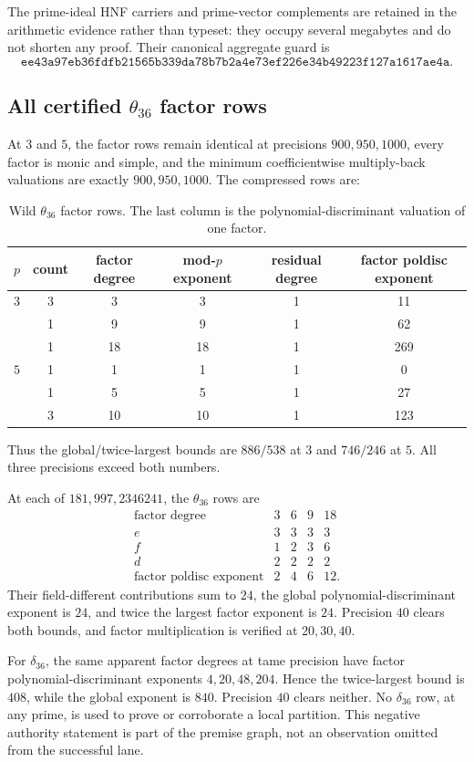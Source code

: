 The prime-ideal HNF carriers and prime-vector complements are retained in the
arithmetic evidence rather than typeset: they occupy several megabytes and
do not shorten any proof.  Their canonical aggregate guard is
\[
\texttt{ee43a97eb36fdfb21565b339da78b7b2a4e73ef226e34b49223f127a1617ae4a}.
\]

\subsection{\texorpdfstring{All certified \(\theta_{36}\) factor rows}{All certified theta36 factor rows}}

At $3$ and $5$, the factor rows remain identical at precisions
$900,950,1000$, every factor is monic and simple, and the minimum
coefficientwise multiply-back valuations are exactly $900,950,1000$.  The
compressed rows are:

\begin{table}[ht]
\centering
\caption{Wild $\theta_{36}$ factor rows.  The last column is the
polynomial-discriminant valuation of one factor.}
\label{tab:wild-theta-factor-rows}
\begin{tabular}{@{}c c c c c c@{}}
\toprule
$p$&count&factor degree&mod-$p$ exponent&residual degree&
factor poldisc exponent\\
\midrule
$3$&3&3&3&1&11\\
&1&9&9&1&62\\
&1&18&18&1&269\\
\midrule
$5$&1&1&1&1&0\\
&1&5&5&1&27\\
&3&10&10&1&123\\
\bottomrule
\end{tabular}
\end{table}

Thus the global/twice-largest bounds are $886/538$ at $3$ and $746/246$ at
$5$.  All three precisions exceed both numbers.

At each of $181,997,2346241$, the $\theta_{36}$ rows are
\begin{equation}
\begin{array}{c|rrrr}
\text{factor degree}&3&6&9&18\\ \hline
e&3&3&3&3\\
f&1&2&3&6\\
d&2&2&2&2\\
\text{factor poldisc exponent}&2&4&6&12.
\end{array}
\label{eq:tame-theta-rows}
\end{equation}
Their field-different contributions sum to $24$, the global
polynomial-discriminant exponent is $24$, and twice the largest factor
exponent is $24$.  Precision $40$ clears both bounds, and factor
multiplication is verified at $20,30,40$.

For $\delta_{36}$, the same apparent factor degrees at tame precision have
factor polynomial-discriminant exponents $4,20,48,204$.  Hence the
twice-largest bound is $408$, while the global exponent is $840$.  Precision
$40$ clears neither.  No $\delta_{36}$ row, at any prime, is used to prove
or corroborate a local partition.  This negative authority statement is
part of the premise graph, not an observation omitted from the successful
lane.
